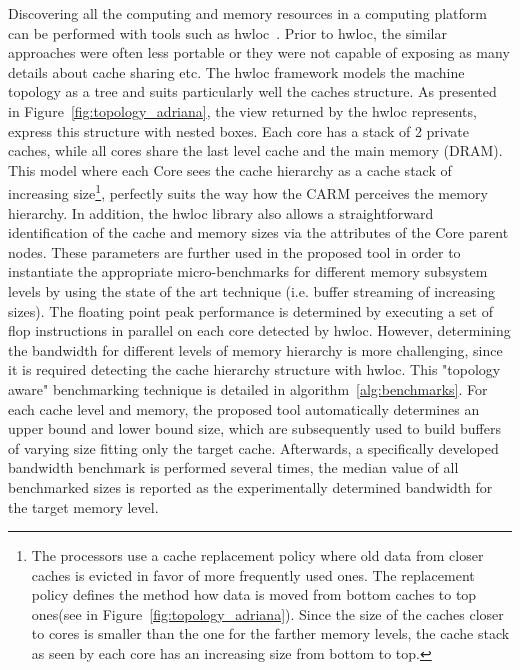 \documentclass[twoside,twocolumn,8pt]{extarticle}
\begin{document}
Discovering all the computing and memory resources in a computing platform can be performed with tools such as
hwloc~\cite{goglin:hal-01330194}. Prior to hwloc,  the similar approaches were often less portable or they were not capable of
exposing as many details about cache sharing etc. The hwloc framework models the machine topology as a tree and suits particularly
well the caches structure.
As presented in Figure~\ref{fig:topology_adriana}, the view returned by the hwloc represents, express this structure with nested
boxes. Each core has a stack of 2 private caches, while all cores share the last level cache and the main memory (DRAM).
This model where each Core sees  the cache hierarchy as a cache stack of increasing size\footnote{
  The processors use a cache replacement policy where old data from closer caches is evicted in favor of more frequently used ones.
  The replacement policy defines the method how data is moved from bottom caches to top ones(see in
  Figure~\ref{fig:topology_adriana}). Since the size of the caches closer to cores is smaller than the one for the farther memory
  levels, the cache stack as seen by each core has an increasing size from bottom to top.
}, perfectly suits the way how the CARM perceives the memory hierarchy.
In addition, the hwloc library also allows a straightforward identification of the cache and memory sizes via the  attributes of
the Core parent nodes. These parameters are further used in the proposed tool  in order to instantiate the appropriate
micro-benchmarks for different memory subsystem levels by using the state of the art technique (i.e. buffer streaming of
increasing sizes).
The floating point peak performance is determined by executing a set of flop instructions in parallel on each core detected by
hwloc. However, determining the bandwidth for different levels of memory hierarchy  is more challenging, since it is required
detecting the cache hierarchy structure with hwloc. This "topology aware" benchmarking technique is detailed in
algorithm~\ref{alg:benchmarks}.
For each cache level and memory, the proposed tool automatically  determines an upper bound and lower bound size, which are
subsequently used to build buffers of varying size fitting only the target cache. Afterwards, a specifically developed bandwidth
benchmark is performed several times, the median value of all benchmarked sizes is reported as the experimentally determined bandwidth
for the target memory level.
\end{document}

